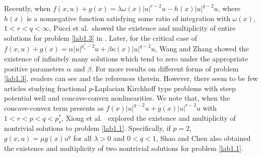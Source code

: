 \documentclass[10pt,a4paper]{amsart}
\numberwithin{equation}{section}
\begin{document}
Recently, when $f(x,u)+g(x)=\lambda\omega(x)|u|^{r-2}u-h(x)|u|^{q-2}u$, where 
$h(x)$ is a nonnegative function satisfying some ratio of integration with
$\omega(x)$, $1 < r < q <\infty$, Pucci et al.\ showed the existence and multiplicity 
of entire solutions for problem \eqref{lab1.3} in \cite{r20}. 
Later, for the critical case of $f(x,u)+g(x)=\alpha|u|^{p^*_s-2}u+\beta 
\kappa(x)|u|^{q-2}u$, Wang and Zhang  \cite{r28} showed the existence of infinitely 
many solutions which tend to zero under the appropriate positive parameters $\alpha$ 
and $\beta$. For more results on different forms of problem \eqref{lab1.3}, readers 
can see  \cite{r9, r17, r25, r32, r35} and the references therein. However, 
there seem to be few articles studying fractional $p$-Laplacian Kirchhoff type problems 
with steep potential well and concave-convex nonlinearities. We note that, when the 
concave-convex term presents as $f(x)|u|^{q-2}u+g(x)|u|^{r-2}u$ with $1<r<p<q<p^*_s$, 
Xiong et al.\  \cite{r33} explored the existence and multiplicity of nontrivial 
solutions to problem \eqref{lab1.1}. Specifically, if $p=2$, $g(x,u)=\mu g(x)u^q$ for all 
$\lambda>0$ and $0<q<1$, Shao and Chen \cite{r21} also obtained the existence and 
multiplicity of two nontrivial solutions for problem \eqref{lab1.1}.
\end{document}
